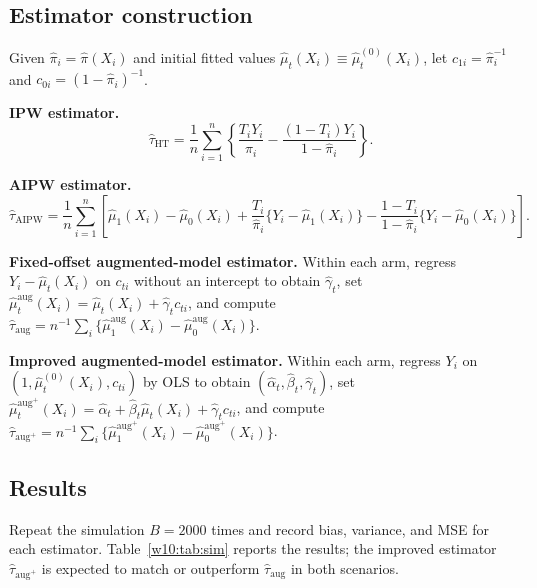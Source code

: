 \documentclass[master.tex]{subfiles}
\begin{document}
\subsection{Estimator construction}
\label{w10:subsec:lab-estimators}

Given $\hat\pi_i = \hat\pi(X_i)$ and initial fitted values
$\hat\mu_t(X_i) \equiv \hat\mu_t^{(0)}(X_i)$, let
$c_{1i} = \hat\pi_i^{-1}$ and $c_{0i} = (1-\hat\pi_i)^{-1}$.

\medskip\noindent
\textbf{IPW estimator.}
\[
  \hat\tau_{\mathrm{HT}}
  = \frac{1}{n}\sum_{i=1}^n
    \left\{
      \frac{T_i Y_i}{\hat\pi_i}
      - \frac{(1-T_i)Y_i}{1-\hat\pi_i}
    \right\}.
\]

\medskip\noindent
\textbf{AIPW estimator.}
\[
  \hat\tau_{\mathrm{AIPW}}
  = \frac{1}{n}\sum_{i=1}^n
    \left[
      \hat\mu_1(X_i) - \hat\mu_0(X_i)
      + \frac{T_i}{\hat\pi_i}\{Y_i - \hat\mu_1(X_i)\}
      - \frac{1-T_i}{1-\hat\pi_i}\{Y_i - \hat\mu_0(X_i)\}
    \right].
\]

\medskip\noindent
\textbf{Fixed-offset augmented-model estimator.}  Within each arm,
regress $Y_i - \hat\mu_t(X_i)$ on $c_{ti}$ without an intercept to
obtain $\hat\gamma_t$, set
$\hat\mu_t^{\mathrm{aug}}(X_i) = \hat\mu_t(X_i) + \hat\gamma_t c_{ti}$,
and compute
$\hat\tau_{\mathrm{aug}}
 = n^{-1}\sum_i\{\hat\mu_1^{\mathrm{aug}}(X_i)
   - \hat\mu_0^{\mathrm{aug}}(X_i)\}$.

\medskip\noindent
\textbf{Improved augmented-model estimator.}  Within each arm,
regress $Y_i$ on $(1, \hat\mu_t^{(0)}(X_i), c_{ti})$ by OLS to
obtain $(\hat\alpha_t, \hat\beta_t, \hat\gamma_t)$, set
$\hat\mu_t^{\mathrm{aug}^+}(X_i)
 = \hat\alpha_t + \hat\beta_t\hat\mu_t(X_i) + \hat\gamma_t c_{ti}$,
and compute
$\hat\tau_{\mathrm{aug}^+}
 = n^{-1}\sum_i\{\hat\mu_1^{\mathrm{aug}^+}(X_i)
   - \hat\mu_0^{\mathrm{aug}^+}(X_i)\}$.

\subsection{Results}
\label{w10:subsec:lab-results}

Repeat the simulation $B = 2000$ times and record bias, variance,
and MSE for each estimator.  Table~\ref{w10:tab:sim} reports the
results; the improved estimator $\hat\tau_{\mathrm{aug}^+}$ is
expected to match or outperform $\hat\tau_{\mathrm{aug}}$ in both
scenarios.
\end{document}
